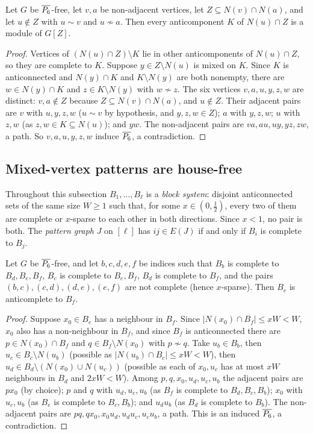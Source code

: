 \begin{lemma}\label{lem:module}
Let $G$ be $\overline{P_6}$-free, let $v,a$ be non-adjacent vertices, let $Z\subseteq N(v)\cap N(a)$, and let
$u\notin Z$ with $u\sim v$ and $u\not\sim a$. Then every anticomponent $K$ of $N(u)\cap Z$ is a module of
$G[Z]$.
\end{lemma}
\begin{proof}
Vertices of $(N(u)\cap Z)\setminus K$ lie in other anticomponents of $N(u)\cap Z$, so they are complete to
$K$. Suppose $y\in Z\setminus N(u)$ is mixed on $K$. Since $K$ is anticonnected and $N(y)\cap K$ and
$K\setminus N(y)$ are both nonempty, there are $w\in N(y)\cap K$ and $z\in K\setminus N(y)$ with
$w\not\sim z$. The six vertices $v,a,u,y,z,w$ are distinct: $v,a\notin Z$ because $Z\subseteq N(v)\cap
N(a)$, and $u\notin Z$. Their adjacent pairs are $v$ with $u,y,z,w$ ($u\sim v$ by hypothesis, and
$y,z,w\in Z$); $a$ with $y,z,w$; $u$ with $z,w$ (as $z,w\in K\subseteq N(u)$); and $yw$. The non-adjacent
pairs are $va, au, uy, yz, zw$, a path. So $v,a,u,y,z,w$ induce $\overline{P_6}$, a contradiction.
\end{proof}

\subsection{Mixed-vertex patterns are house-free}
Throughout this subsection $B_1,\dots,B_\ell$ is a \emph{block system}: disjoint anticonnected sets of the
same size $W\ge1$ such that, for some $x\in(0,\frac12)$, every two of them are complete or $x$-sparse to
each other in both directions. Since $x<1$, no pair is both. The \emph{pattern graph} $J$ on $[\ell]$ has
$ij\in E(J)$ if and only if $B_i$ is complete to $B_j$.

\begin{lemma}\label{lem:diagonal}
Let $G$ be $\overline{P_6}$-free, and let $b,c,d,e,f$ be indices such that $B_b$ is complete to $B_d,B_e,B_f$, $B_c$ is
complete to $B_e,B_f$, $B_d$ is complete to $B_f$, and the pairs $(b,c),(c,d),(d,e),(e,f)$ are not
complete (hence $x$-sparse). Then $B_e$ is anticomplete to $B_f$.
\end{lemma}
\begin{proof}
Suppose $x_0\in B_e$ has a neighbour in $B_f$. Since $|N(x_0)\cap B_f|\le xW<W$, $x_0$ also has a
non-neighbour in $B_f$, and since $B_f$ is anticonnected there are $p\in N(x_0)\cap B_f$ and $q\in
B_f\setminus N(x_0)$ with $p\not\sim q$. Take $u_b\in B_b$, then $u_c\in B_c\setminus N(u_b)$ (possible as
$|N(u_b)\cap B_c|\le xW<W$), then $u_d\in B_d\setminus(N(x_0)\cup N(u_c))$ (possible as each of $x_0,u_c$
has at most $xW$ neighbours in $B_d$ and $2xW<W$). Among $p,q,x_0,u_d,u_c,u_b$ the adjacent pairs are
$px_0$ (by choice); $p$ and $q$ with $u_d,u_c,u_b$ (as $B_f$ is complete to $B_d,B_c,B_b$); $x_0$ with
$u_c,u_b$ (as $B_e$ is complete to $B_c,B_b$); and $u_du_b$ (as $B_d$ is complete to $B_b$). The non-adjacent
pairs are $pq,qx_0,x_0u_d,u_du_c,u_cu_b$, a path. This is an induced $\overline{P_6}$, a contradiction.
\end{proof}

